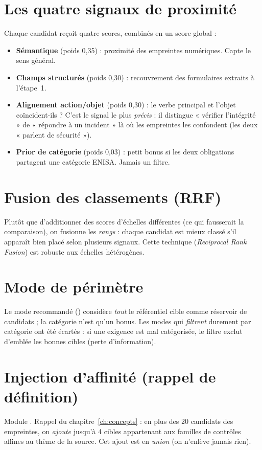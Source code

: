 \documentclass[11pt,a4paper]{report}
\newcommand{\code}[1]{\texttt{\detokenize{#1}}}
\begin{document}
\section{Les quatre signaux de proximité}
Chaque candidat reçoit quatre scores, combinés en un score global :
\begin{itemize}[nosep]
  \item \textbf{Sémantique} (poids 0,35) : proximité des empreintes numériques. Capte le sens général.
  \item \textbf{Champs structurés} (poids 0,30) : recouvrement des formulaires extraits à l'étape~1.
  \item \textbf{Alignement action/objet} (poids 0,30) : le verbe principal et l'objet coïncident-ils ? C'est le signal le plus \emph{précis} : il distingue « vérifier l'intégrité » de « répondre à un incident » là où les empreintes les confondent (les deux « parlent de sécurité »).
  \item \textbf{Prior de catégorie} (poids 0,03) : petit bonus si les deux obligations partagent une catégorie ENISA. Jamais un filtre.
\end{itemize}

\section{Fusion des classements (RRF)}
Plutôt que d'additionner des scores d'échelles différentes (ce qui fausserait la comparaison), on fusionne les \emph{rangs} : chaque candidat est mieux classé s'il apparaît bien placé selon plusieurs signaux. Cette technique (\emph{Reciprocal Rank Fusion}) est robuste aux échelles hétérogènes.

\section{Mode de périmètre}
Le mode recommandé (\code{soft_enisa}) considère \emph{tout} le référentiel cible comme réservoir de candidats ; la catégorie n'est qu'un bonus. Les modes qui \emph{filtrent} durement par catégorie ont été écartés : si une exigence est mal catégorisée, le filtre exclut d'emblée les bonnes cibles (perte d'information).

\section{Injection d'affinité (rappel de définition)}
\label{sec:affinity}
Module \code{family_affinity.py}. Rappel du chapitre~\ref{ch:concepts} : en plus des 20 candidats des empreintes, on \emph{ajoute} jusqu'à 4 cibles appartenant aux familles de contrôles affines au thème de la source. Cet ajout est en \emph{union} (on n'enlève jamais rien).
\end{document}
